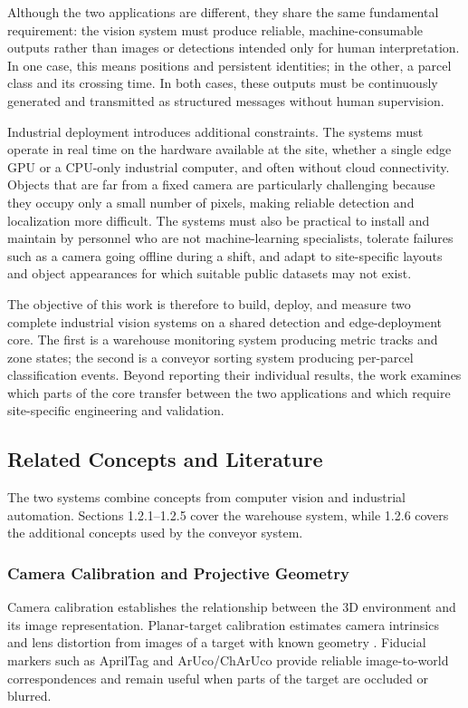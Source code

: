 \documentclass[9pt,a4paper,twocolumn]{rho-class/rho}
\begin{document}
Although the two applications are different, they share the same fundamental requirement: the vision system must produce reliable, machine-consumable outputs rather than images or detections intended only for human interpretation. In one case, this means positions and persistent identities; in the other, a parcel class and its crossing time. In both cases, these outputs must be continuously generated and transmitted as structured messages without human supervision.

Industrial deployment introduces additional constraints. The systems must operate in real time on the hardware available at the site, whether a single edge GPU or a CPU-only industrial computer, and often without cloud connectivity. Objects that are far from a fixed camera are particularly challenging because they occupy only a small number of pixels, making reliable detection and localization more difficult. The systems must also be practical to install and maintain by personnel who are not machine-learning specialists, tolerate failures such as a camera going offline during a shift, and adapt to site-specific layouts and object appearances for which suitable public datasets may not exist.

The objective of this work is therefore to build, deploy, and measure two complete industrial vision systems on a shared detection and edge-deployment core. The first is a warehouse monitoring system producing metric tracks and zone states; the second is a conveyor sorting system producing per-parcel classification events. Beyond reporting their individual results, the work examines which parts of the core transfer between the two applications and which require site-specific engineering and validation.

\subsection{Related Concepts and Literature}

The two systems combine concepts from computer vision and industrial automation. Sections 1.2.1--1.2.5 cover the warehouse system, while 1.2.6 covers the additional concepts used by the conveyor system.

\subsubsection{Camera Calibration and Projective Geometry}

Camera calibration establishes the relationship between the 3D environment and its image representation. Planar-target calibration estimates camera intrinsics and lens distortion from images of a target with known geometry \cite{zhang2000flexible}. Fiducial markers such as AprilTag \cite{olson2011apriltag} and ArUco/ChArUco \cite{garridojurado2014aruco} provide reliable image-to-world correspondences and remain useful when parts of the target are occluded or blurred.
\end{document}
